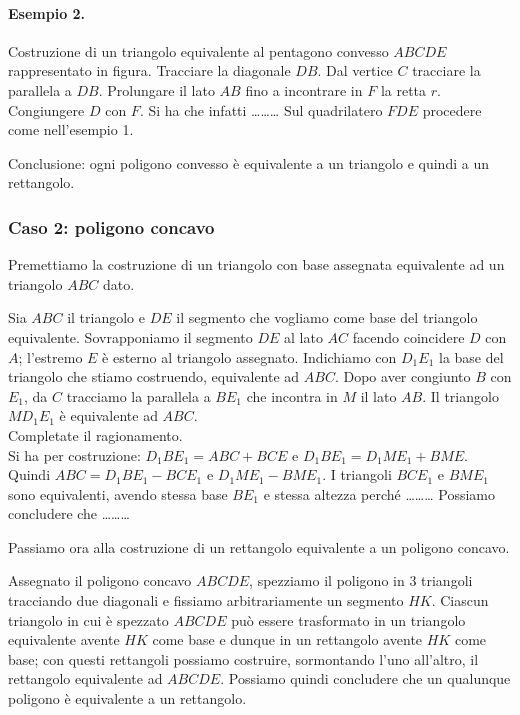 \paragraph{Esempio 2.}
Costruzione di un triangolo equivalente al pentagono convesso $ABCDE$ rappresentato in figura.
Tracciare la diagonale $DB$.
Dal vertice $C$ tracciare la parallela a $DB$.
Prolungare il lato $AB$ fino a incontrare in $F$ la retta $r$.
Congiungere $D$ con $F$.
Si ha che  infatti \ldots\ldots\ldots{} 
Sul quadrilatero $FDE$ procedere come nell'esempio 1.

Conclusione: ogni poligono convesso è equivalente a un triangolo e quindi a un rettangolo.

\subsubsection{Caso 2: poligono concavo}

Premettiamo la costruzione di un triangolo con base assegnata equivalente ad un triangolo $ABC$ dato. 

Sia $ABC$ il triangolo e $DE$ il segmento che vogliamo come base del triangolo equivalente.
Sovrapponiamo il segmento $DE$ al lato $AC$ facendo coincidere $D$ con $A$; l'estremo $E$ è esterno al triangolo assegnato. Indichiamo con $D_1E_1$ la base del triangolo che stiamo costruendo, equivalente ad $ABC$. Dopo aver congiunto $B$ con $E_1$, da $C$ tracciamo la parallela a $BE_1$ che incontra in $M$ il lato $AB$. Il triangolo $MD_1E_1$ è equivalente ad $ABC$.\\
Completate il ragionamento.\\
Si ha per costruzione: 
$D_1BE_1=ABC+BCE$ e $D_1BE_1=D_1ME_1+BME$.
Quindi $ABC=D_1BE_1-BCE_1$ e $D_1ME_1-BME_1$.
I triangoli $BCE_1$ e $BME_1$ sono equivalenti, avendo stessa base $BE_1$ e stessa altezza perché \ldots\ldots\ldots{}	Possiamo concludere che \ldots\ldots\ldots{}

Passiamo ora alla costruzione di un rettangolo equivalente a un poligono concavo.

Assegnato il poligono concavo $ABCDE$, spezziamo il poligono in 3 triangoli tracciando due diagonali e fissiamo arbitrariamente un segmento $HK$. Ciascun triangolo in cui è spezzato $ABCDE$ può essere trasformato in un triangolo equivalente avente $HK$ come base e dunque in un rettangolo avente $HK$ come base; con questi rettangoli possiamo costruire, sormontando l'uno all'altro, il rettangolo equivalente ad $ABCDE$.  
Possiamo quindi concludere che un qualunque poligono è equivalente a un rettangolo.

